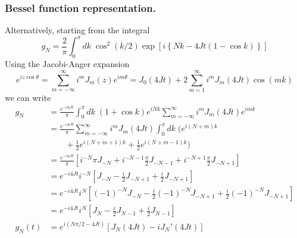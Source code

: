 \documentclass[../../../main.tex]{subfiles}
\begin{document}
\subsubsection{Bessel function representation.}
Alternatively, starting from the integral
\begin{equation*}
    g_N = \frac{2 }{\pi} \int_{0} ^{\pi} dk\; \cos^2 (k/2) \exp \left[i \left\{Nk - 4Jt (1-\cos k)  \right\}  \right]
\end{equation*}
Using the Jacobi-Anger expansion
\begin{equation*}
    e^{i z \cos\theta} = \sum_{m=-\infty}^{\infty} i^{m} J_{m}(z)e^{i m \theta}
    = J_0(4Jt) + 2 \sum_{m=1}^{\infty} i^m J_m(4Jt) \cos(mk)
\end{equation*}
we can write
\begin{align*}
    g_N
     & = \frac{e^{-i4Jt}}{\pi}\int_{0}^{\pi} dk\;(1+\cos k) e^{iNk}\sum_{m=-\infty}^{\infty} i^{m} J_{m}(4Jt)e^{i m k}                   \\
     & = \frac{e^{-i4Jt}}{\pi} \sum_{m=-\infty}^{\infty} i^{m} J_{m}(4Jt) \int_{0}^{\pi} dk\; \big( e ^{i(N+m)k}                         \\
     & \qquad + \frac{1}{2}e ^{i(N+m+1)k} + \frac{1 }{2 } e ^{i(N+m-1)k}  \big)                                                          \\
     & = \frac{e^{-i4Jt}}{\pi} \left[ i ^{-N}\pi J_{-N}+ i ^{-N-1} \frac{\pi }{2 } J_{-N-1}+  i ^{-N+1} \frac{\pi }{2 } J_{-N+1} \right] \\
     & = e^{-i4Jt} i ^{-N} \left[ J_{-N} -  \frac{i }{2 } J_{-N+1} + \frac{i }{2 } J_{-N+1} \right]                                      \\
     & = e^{-i4Jt} i ^{N} \left[(-1)^{-N} J_{-N} -  \frac{i }{2 }(-1)^{-N} J_{-N+1} + \frac{i }{2 }(-1)^{-N} J_{-N+1} \right]            \\
     & = e^{-i4Jt} i ^{N} \left[ J_{N} -  \frac{i }{2 } J_{N-1} + \frac{i }{2 }J_{N-1} \right]                                           \\
    g_N(t)
     & = e^{i(N\pi/2 -4Jt)}  \left[ J_{N}(4Jt) -i  J_N' (4Jt)\right]
\end{align*}
\end{document}
